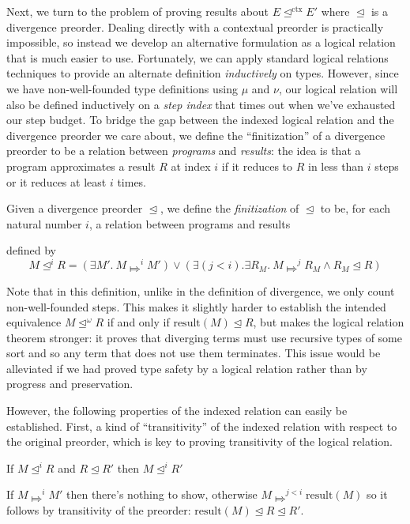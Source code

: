 \documentclass[acmsmall,screen,12pt]{acmart}
\newif\iflong
\renewcommand{\u}{\underline}
\newcommand{\pipe}{\,\,|\,\,}
\newcommand{\apreorder}{\trianglelefteq}
\newcommand{\ctxize}[1]{\mathrel{{#1}^{\text{ctx}}}}
\newcommand{\ix}[2]{\mathrel{#1^{#2}}}
\newcommand{\bigstepsin}[1]{\mathrel{\Mapsto^{#1}}}
\newcommand{\result}{\text{result}}
\begin{document}
{\begin{longonly}
Next, we turn to the problem of proving results about $E
\ctxize\apreorder E'$ where $\apreorder$ is a divergence preorder.
%
Dealing directly with a contextual preorder is practically impossible,
so instead we develop an alternative formulation as a logical relation
that is much easier to use.
%
Fortunately, we can apply standard logical relations techniques to
provide an alternate definition \emph{inductively} on types.
%
However, since we have non-well-founded type definitions using
$\mu$ and $\nu$, our logical relation will also be defined inductively on a
\emph{step index} that times out when we've exhausted our step budget.
%
To bridge the gap between the indexed logical relation and the
divergence preorder we care about, we define the ``finitization'' of a
divergence preorder to be a relation between \emph{programs} and
\emph{results}: the idea is that a program approximates a result $R$
at index $i$ if it reduces to $R$ in less than $i$ steps or it reduces
at least $i$ times.
\end{longonly}

\begin{definition}
  Given a divergence preorder $\apreorder$, we define the
  \emph{finitization} of $\apreorder$ to be, for each natural number
  $i$, a relation between programs and results
\iflong
  \[ {\ix\apreorder i} \subseteq \{ M \pipe \cdot\vdash M : \u F 2\} \times \text{Results} \]
\fi
  defined by
  \[
  M \ix \apreorder i R = (\exists M'.~ M \bigstepsin{i} M') \vee (\exists (j< i). \exists R_M.~ M \bigstepsin{j} R_M \wedge R_M \apreorder R)
  \]
\end{definition}

\begin{longonly}
Note that in this definition, unlike in the definition of divergence,
we only count non-well-founded steps.
%
This makes it slightly harder to establish the intended equivalence $M
\ix \apreorder \omega R$ if and only if $\result(M) \apreorder R$, but
makes the logical relation theorem stronger: it proves that diverging
terms must use recursive types of some sort and so any term that does
not use them terminates.
%
This issue would be alleviated if we had proved type safety by a
logical relation rather than by progress and preservation.

However, the following properties of the indexed relation can easily
be established.
%
First, a kind of ``transitivity'' of the indexed relation with respect
to the original preorder, which is key to proving transitivity of the
logical relation.
\begin{lemma}
\label{lem:module}
  If $M \ix\apreorder i R$ and $R \apreorder R'$ then $M \ix\apreorder i R'$
\end{lemma}
\begin{longproof}
  If $M \bigstepsin{i} M'$ then there's nothing to show, otherwise
  $M \bigstepsin{j< i} \result(M)$ so it follows by transitivity of the
  preorder: $\result(M) \apreorder R \apreorder R'$.
\end{longproof}


\end{longonly}}
\end{document}
